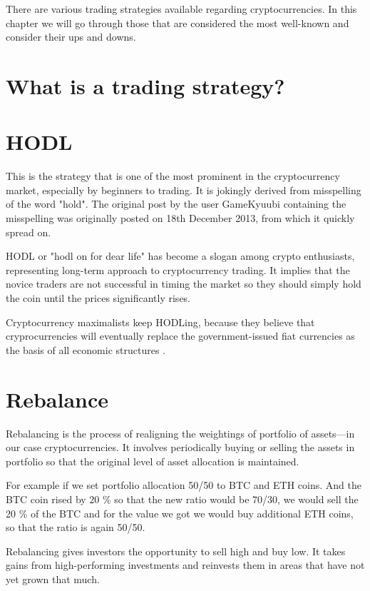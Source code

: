 There are various trading strategies available regarding cryptocurrencies.
In this chapter we will go through those that are considered the most well-known and consider
their ups and downs.

\section*{What is a trading strategy?}

\section{HODL}

This is the strategy that is one of the most prominent in the cryptocurrency market, especially by beginners to trading.
It is jokingly derived from misspelling of the word "hold". The original post by the user GameKyuubi \cite{hodl-post} containing the misspelling was originally posted on 18th December 2013, from which it quickly spread on.

HODL or "hodl on for dear life" has become a slogan among crypto enthusiasts, representing long-term approach to cryptocurrency trading. It implies that the novice traders are not successful in timing the market so they should simply hold the coin until the prices significantly rises.

Cryptocurrency maximalists keep HODLing, because they believe that cryprocurrencies will eventually replace the government-issued fiat currencies as the basis of all economic structures \cite{investopedia-hodl}.

\section{Rebalance}
Rebalancing is the process of realigning the weightings of portfolio of assets---in our case cryptocurrencies. It involves periodically buying or selling the assets in portfolio so that the original level of asset allocation is maintained\cite{investopedia-rebalancing}.

For example if we set portfolio allocation 50/50 to BTC and ETH coins. And the BTC coin rised by 20 \% so that the new ratio would be 70/30, we would sell the 20 \% of the BTC and for the value we got we would buy additional ETH coins, so that the ratio is again 50/50.

Rebalancing gives investors the opportunity to sell high and buy low. It takes gains from high-performing investments and reinvests them in areas that have not yet grown that much.

